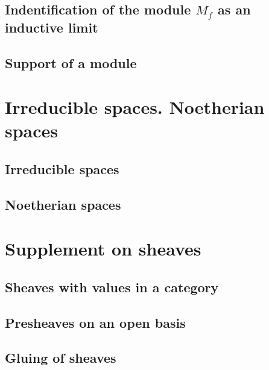         \subsection{Indentification of the module $M_f$ as an inductive limit}
        \label{0-prelim-1.6}
        

        \subsection{Support of a module}
        \label{0-prelim-1.7}
        

    \section{Irreducible spaces. Noetherian spaces}
    \label{0-prelim-2}

        \subsection{Irreducible spaces}
        \label{0-prelim-2.1}
        

        \subsection{Noetherian spaces}
        \label{0-prelim-2.2}
        

    \section{Supplement on sheaves}
    \label{0-prelim-3}

        \subsection{Sheaves with values in a category}
        \label{0-prelim-3.1}
        

        \subsection{Presheaves on an open basis}
        \label{0-prelim-3.2}
        

        \subsection{Gluing of sheaves}
        \label{0-prelim-3.3}
        

